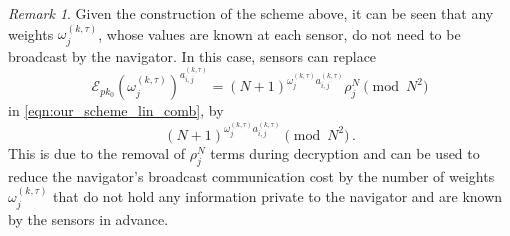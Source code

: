 \documentclass[10pt,letterpaper,oneside,twocolumn,journal]{IEEEtran}
\theoremstyle{definition}
\theoremstyle{definition}
\theoremstyle{remark}
\newtheorem*{remark}{Remark}
\begin{document}
\begin{remark}
    Given the construction of the scheme above, it can be seen that any weights $\omega^{(k,\tau)}_j$, whose values are known at each sensor, do not need to be broadcast by the navigator. In this case, sensors can replace
    \begin{equation}
        \mathcal{E}_{pk_0}(\omega^{(k,\tau)}_j)^{a^{(k,\tau)}_{i,j}} = (N+1)^{\omega^{(k,\tau)}_ja^{(k,\tau)}_{i,j}}\rho_j^N \pmod{N^2}
    \end{equation}
    in \eqref{eqn:our_scheme_lin_comb}, by
    \begin{equation}
        (N+1)^{\omega^{(k,\tau)}_ja^{(k,\tau)}_{i,j}} \pmod{N^2}\,.
    \end{equation}
    This is due to the removal of $\rho_j^N$ terms during decryption and can be used to reduce the navigator's broadcast communication cost by the number of weights $\omega^{(k,\tau)}_j$ that do not hold any information private to the navigator and are known by the sensors in advance.
\end{remark}

% 
%                                                                               
%                                                                               
%                                                                               
% 
\end{document}
